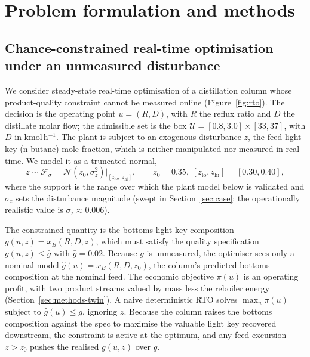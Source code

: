 \section{Problem formulation and methods}
\label{sec:methods}

\subsection{Chance-constrained real-time optimisation under an unmeasured disturbance}
\label{sec:methods-rto}

We consider steady-state real-time optimisation of a distillation column whose
product-quality constraint cannot be measured online (Figure~\ref{fig:rto}). The decision is
the operating point $u=(R,D)$, with $R$ the reflux ratio and $D$ the distillate molar flow;
the admissible set is the box $\mathcal{U}=[0.8,3.0]\times[33,37]$, with $D$ in
kmol\,h$^{-1}$. The plant is subject to an exogenous disturbance $z$, the feed light-key
(n-butane) mole fraction, which is neither manipulated nor measured in real time. We model
it as a truncated normal,
\begin{equation*}
z \sim \mathcal{F}_\sigma = \mathcal{N}\!\left(z_0,\sigma_z^2\right)\big|_{[z_{\mathrm{lo}},\,z_{\mathrm{hi}}]},
\qquad z_0=0.35,\;[z_{\mathrm{lo}},z_{\mathrm{hi}}]=[0.30,0.40],
\end{equation*}
where the support is the range over which the plant model below is validated and $\sigma_z$
sets the disturbance magnitude (swept in Section~\ref{sec:case}; the operationally realistic
value is $\sigma_z\approx 0.006$).

The constrained quantity is the bottoms light-key composition $g(u,z)=x_{B}(R,D,z)$, which
must satisfy the quality specification $g(u,z)\le\bar g$ with $\bar g = 0.02$. Because $g$ is
unmeasured, the optimiser sees only a nominal model $\hat g(u)=x_B(R,D,z_0)$, the column's
predicted bottoms composition at the nominal feed. The economic objective $\pi(u)$ is an
operating profit, with two product streams valued by mass less the reboiler energy
(Section~\ref{sec:methods-twin}). A naive deterministic RTO solves $\max_{u}\pi(u)$ subject
to $\hat g(u)\le\bar g$, ignoring $z$. Because the column raises the bottoms composition
against the spec to maximise the valuable light key recovered downstream, the constraint is
active at the optimum, and any feed excursion $z>z_0$ pushes the realised $g(u,z)$ over $\bar
g$.

